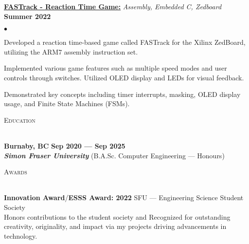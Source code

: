 \documentclass[a4paper]{article}
\newcommand{\lineunder} {
    \vspace*{-8pt} \\
    \hspace*{-18pt} \hrulefill\\
}
\newcommand{\header} [1] {
    {\hspace*{-18pt}\vspace*{6pt} \textsc{#1}}
    \vspace*{-6pt} \lineunder{}
}
\newcommand{\school} [5] {
    {\textbf{#3} \hfill \textbf{#4 --- #5}\\ \textbf{\emph{#1}} (#2)\\}
}
\newenvironment{achievements}{
    \begin{list}{$\bullet$}{
        \setlength{\topsep}{0pt}
        \setlength{\itemsep}{-1pt}
        \setlength{\parskip}{0pt}
        \setlength{\parsep}{0pt}
        \setlength{\partopsep}{0pt}}
    }{
    \end{list}
}
\begin{document}
    \vspace*{5pt}
    \href{https://github.com/SatireSage/FASTrack}{\textbf{FASTrack - Reaction Time Game:}} {\sl Assembly, Embedded C, Zedboard\/} \hfill \textbf{Summer 2022}
    \begin{achievements}
        \item Developed a reaction time-based game called FASTrack for the Xilinx ZedBoard, utilizing the ARM7 assembly instruction set.
        \item Implemented various game features such as multiple speed modes and user controls through switches. Utilized OLED display and LEDs for visual feedback.
        \item Demonstrated key concepts including timer interrupts, masking, OLED display usage, and Finite State Machines (FSMs).
    \end{achievements}
    \vspace*{5pt}

    \header{Education}
    \school{Simon Fraser University}{B.A.Sc. Computer Engineering --- Honours}{Burnaby, BC}{Sep 2020}{Sep 2025}
    \vspace*{5pt}

    \header{Awards}
    \textbf{Innovation Award}/\textbf{ESSS Award: 2022} \hfill SFU --- Engineering Science Student Society\\
    Honors contributions to the student society and Recognized for outstanding creativity, originality, and impact via my projects driving advancements in technology.\\
\end{document}
